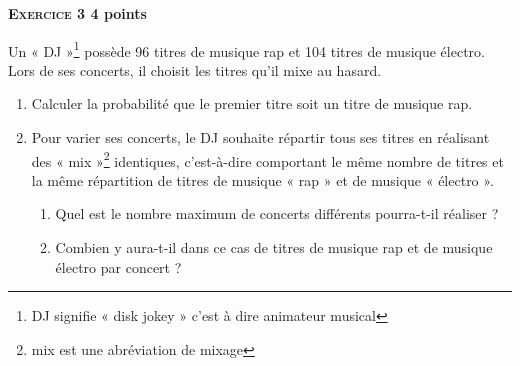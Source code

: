 \textbf{\textsc{Exercice 3} \hfill 4 points}

\medskip

Un « DJ »\footnote{DJ signifie « disk jokey » c'est à dire animateur musical} possède 96 titres de musique rap et 104 titres de musique électro. Lors
de ses concerts, il choisit les titres qu'il mixe au hasard.

\medskip

\begin{enumerate}
\item Calculer la probabilité que le premier titre soit un titre de musique rap.
\item Pour varier ses concerts, le DJ souhaite répartir tous ses titres en réalisant des « mix »\footnote{mix est une abréviation de mixage} identiques, c'est-à-dire comportant le même nombre de titres et la même
répartition de titres de musique « rap » et de musique « électro ».
	\begin{enumerate}
		\item Quel est le nombre maximum de concerts différents pourra-t-il réaliser ?
		\item Combien y aura-t-il dans ce cas de titres de musique rap et de musique
électro par concert ?
	\end{enumerate}
\end{enumerate}
\vspace{0.25cm}

